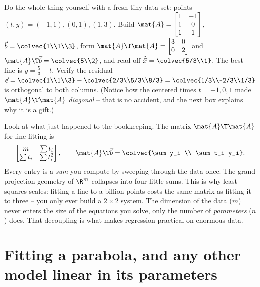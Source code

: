 \begin{labbox}
Do the whole thing yourself with a fresh tiny data set: points $(t,y)=(-1,1),(0,1),(1,3)$. Build
$\mat{A}=\begin{bmatrix}1&-1\\1&0\\1&1\end{bmatrix}$, $\vec{b}=\colvec{1\\1\\3}$, form
$\mat{A}\T\mat{A}=\begin{bmatrix}3&0\\0&2\end{bmatrix}$ and $\mat{A}\T\vec{b}=\colvec{5\\2}$, and
read off $\hat{\vec{x}}=\colvec{5/3\\1}$. The best line is $y=\tfrac53 + t$. Verify the residual
$\vec{e}=\colvec{1\\1\\3}-\colvec{2/3\\5/3\\8/3}=\colvec{1/3\\-2/3\\1/3}$ is orthogonal to both
columns. (Notice how the centered times $t=-1,0,1$ made $\mat{A}\T\mat{A}$ \emph{diagonal} -- that
is no accident, and the next box explains why it is a gift.)
\end{labbox}

\begin{aestheticbox}
Look at what just happened to the bookkeeping. The matrix $\mat{A}\T\mat{A}$ for line fitting is
\[
  \begin{bmatrix} m & \sum t_i \\ \sum t_i & \sum t_i^2 \end{bmatrix},
  \qquad
  \mat{A}\T\vec{b}=\colvec{\sum y_i \\ \sum t_i y_i}.
\]
Every entry is a \emph{sum} you compute by sweeping through the data once. The grand projection
geometry of $\R^m$ collapses into four little sums. This is why least squares scales: fitting a
line to a billion points costs the same matrix as fitting it to three -- you only ever build a
$2\times2$ system. The dimension of the data ($m$) never enters the size of the equations you
solve, only the number of \emph{parameters} ($n$) does. That decoupling is what makes regression
practical on enormous data.
\end{aestheticbox}

\section{Fitting a parabola, and any other model linear in its parameters}

